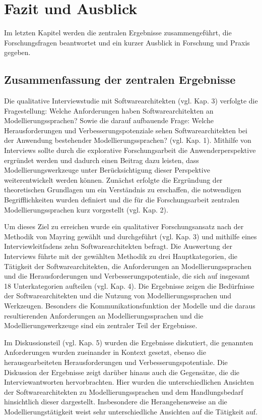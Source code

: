 

\lstset{language=C}

\chapter{Fazit und Ausblick}
Im letzten Kapitel werden die zentralen Ergebnisse zusammengeführt, die Forschungsfragen beantwortet und ein kurzer Ausblick in Forschung und Praxis gegeben.

\section{Zusammenfassung der zentralen Ergebnisse}

Die qualitative Interviewstudie mit Softwarearchitekten (vgl. Kap. 3) verfolgte die Fragestellung: Welche Anforderungen haben Softwarearchitekten an Modellierungssprachen? Sowie die darauf aufbauende Frage: Welche Herausforderungen und Verbesserungspotenziale sehen Softwarearchitekten bei der Anwendung bestehender Modellierungssprachen? (vgl. Kap. 1). Mithilfe von Interviews sollte durch die explorative Forschungsarbeit die Anwenderperspektive ergründet werden und dadurch einen Beitrag dazu leisten, dass Modellierungswerkzeuge unter Berücksichtigung dieser Perspektive weiterentwickelt werden können. Zunächst erfolgte die Ergründung der theoretischen Grundlagen um ein Verständnis zu erschaffen, die notwendigen Begrifflichkeiten wurden definiert und die für die Forschungsarbeit zentralen Modellierungssprachen kurz vorgestellt (vgl. Kap. 2).

Um dieses Ziel zu erreichen wurde ein qualitativer Forschungsansatz nach der Methodik von Mayring gewählt und durchgeführt (vgl. Kap. 3) und mithilfe eines Interviewleitfadens zehn Softwarearchitekten befragt. Die Auswertung der Interviews führte mit der gewählten Methodik zu drei Hauptkategorien, die Tätigkeit der Softwarearchitekten, die Anforderungen an Modellierungssprachen und die Herausforderungen und Verbesserungspotentiale, die sich auf insgesamt 18 Unterkategorien aufteilen (vgl. Kap. 4). Die Ergebnisse zeigen die Bedürfnisse der Softwarearchitekten und die Nutzung von Modellierungssprachen und Werkzeugen. Besonders die Kommunikationsfunktion der Modelle und die daraus resultierenden Anforderungen an Modellierungssprachen und die Modellierungswerkzeuge sind ein zentraler Teil der Ergebnisse.

Im Diskussionsteil (vgl. Kap. 5) wurden die Ergebnisse diskutiert, die genannten Anforderungen wurden zueinander in Kontext gesetzt, ebenso die herausgearbeiteten Herausforderungen und Verbesserungspotentiale. Die Diskussion der Ergebnisse zeigt darüber hinaus auch die Gegensätze, die die Interviewantworten hervorbrachten. Hier wurden die unterschiedlichen Ansichten der Softwarearchitekten zu Modellierungssprachen und dem Handlungsbedarf hinsichtlich dieser dargestellt. Insbesondere die Herangehensweise an die Modellierungstätigkeit weist sehr unterschiedliche Ansichten auf die Tätigkeit auf.

